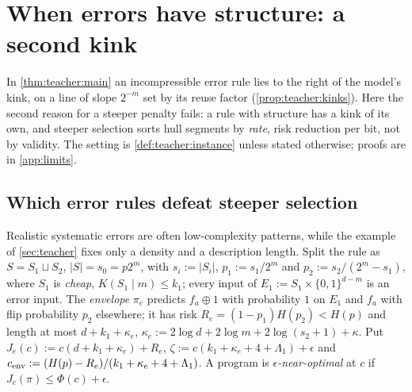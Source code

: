 \section{When errors have structure: a second kink}\label{sec:limits}

In \cref{thm:teacher:main} an incompressible error rule lies to the right of the model's kink, on a line of slope $2^{-m}$ set by its reuse factor (\cref{prop:teacher:kinks}). Here the second reason for a steeper penalty fails: a rule with structure has a kink of its own, and steeper selection sorts hull segments by \emph{rate}, risk reduction per bit, not by validity. The setting is \cref{def:teacher:instance} unless stated otherwise; proofs are in \cref{app:limits}.

\subsection{Which error rules defeat steeper selection}\label{sec:limits:rules}

Realistic systematic errors are often low-complexity patterns, while the example of \cref{sec:teacher} fixes only a density and a description length. Split the rule as $S=S_1\sqcup S_2$, $|S|=s_0=p2^m$, with $s_i:=|S_i|$, $p_1:=s_1/2^m$ and $p_2:=s_2/(2^m-s_1)$, where $S_1$ is \emph{cheap}, $K(S_1\mid m)\le k_1$; every input of $E_1:=S_1\times\{0,1\}^{d-m}$ is an error input. The \emph{envelope} $\pi_e$ predicts $f_a\oplus1$ with probability $1$ on $E_1$ and $f_a$ with flip probability $p_2$ elsewhere; it has risk $R_e=(1-p_1)H(p_2)<H(p)$ and length at most $d+k_1+\kappa_e$, $\kappa_e:=2\log d+2\log m+2\log(s_2+1)+\kappa$. Put $J_e(c):=c(d+k_1+\kappa_e)+R_e$, $\zeta:=c(k_1+\kappa_e+4+\Lambda_1)+\epsilon$ and $c_{\rm env}:=(H(p)-R_e)/(k_1+\kappa_e+4+\Lambda_1)$. A program is \emph{$\epsilon$-near-optimal} at $c$ if $J_c(\pi)\le\Phi(c)+\epsilon$.

